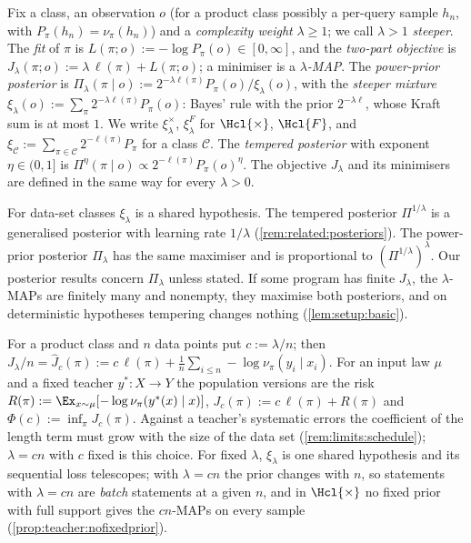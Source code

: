 \begin{definition}\label{def:setup:objectives}
Fix a class, an observation $o$ (for a product class possibly a per-query sample $h_n$, with $P_\pi(h_n)=\nu_\pi(h_n)$) and a \emph{complexity weight} $\lambda\ge1$; we call $\lambda>1$ \emph{steeper}. The \emph{fit} of $\pi$ is $L(\pi;o):=-\log P_\pi(o)\in[0,\infty]$, and the \emph{two-part objective} is $J_\lambda(\pi;o):=\lambda\,\ell(\pi)+L(\pi;o)$; a minimiser is a \emph{$\lambda$-MAP}. The \emph{power-prior posterior} is $\Pi_\lambda(\pi\mid o):=2^{-\lambda\ell(\pi)}P_\pi(o)/\xi_\lambda(o)$, with the \emph{steeper mixture} $\xi_\lambda(o):=\sum_\pi2^{-\lambda\ell(\pi)}P_\pi(o)$: Bayes' rule with the prior $2^{-\lambda\ell}$, whose Kraft sum is at most $1$. We write $\xi^\times_\lambda$, $\xi^F_\lambda$ for $\Hcl{\times}$, $\Hcl{F}$, and $\xi_{\mathcal C}:=\sum_{\pi\in\mathcal C}2^{-\ell(\pi)}P_\pi$ for a class $\mathcal C$. The \emph{tempered posterior} with exponent $\eta\in(0,1]$ is $\Pi^\eta(\pi\mid o)\propto2^{-\ell(\pi)}P_\pi(o)^\eta$. The objective $J_\lambda$ and its minimisers are defined in the same way for every $\lambda>0$.
\end{definition}

For data-set classes $\xi_\lambda$ is a shared hypothesis. The tempered posterior $\Pi^{1/\lambda}$ is a generalised posterior with learning rate $1/\lambda$ (\cref{rem:related:posteriors}). The power-prior posterior $\Pi_\lambda$ has the same maximiser and is proportional to $(\Pi^{1/\lambda})^\lambda$. Our posterior results concern $\Pi_\lambda$ unless stated. If some program has finite $J_\lambda$, the $\lambda$-MAPs are finitely many and nonempty, they maximise both posteriors, and on deterministic hypotheses tempering changes nothing (\cref{lem:setup:basic}).

\begin{remark}[Per-sample form; $\lambda=cn$ gives batch objectives]\label{rem:setup:persample}
For a product class and $n$ data points put $c:=\lambda/n$; then $J_\lambda/n=\hat J_c(\pi):=c\,\ell(\pi)+\frac1n\sum_{i\le n}-\log\nu_\pi(y_i\mid x_i)$. For an input law $\mu$ and a fixed teacher $y^*:X\to Y$ the population versions are the risk $R(\pi):=\Ex_{x\sim\mu}[-\log\nu_\pi(y^*(x)\mid x)]$, $J_c(\pi):=c\,\ell(\pi)+R(\pi)$ and $\Phi(c):=\inf_\pi J_c(\pi)$. Against a teacher's systematic errors the coefficient of the length term must grow with the size of the data set (\cref{rem:limits:schedule}); $\lambda=cn$ with $c$ fixed is this choice. For fixed $\lambda$, $\xi_\lambda$ is one shared hypothesis and its sequential loss telescopes; with $\lambda=cn$ the prior changes with $n$, so statements with $\lambda=cn$ are \emph{batch} statements at a given $n$, and in $\Hcl{\times}$ no fixed prior with full support gives the $cn$-MAPs on every sample (\cref{prop:teacher:nofixedprior}).
\end{remark}

